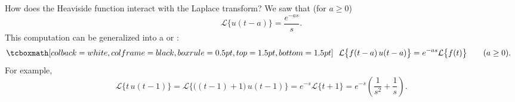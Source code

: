 How does the Heaviside function interact with the Laplace
transform?  We saw that (for $a \geq 0$)
\begin{equation*}
\mathcal{L} \bigl\{ u(t-a) \bigr\} = \frac{e^{-as}}{s} .
\end{equation*}
This computation can be generalized into a \emph{}
or \emph{}:
\begin{equation} \label{ltd:sseq}
\mybxbg{~~
\mathcal{L} \bigl\{ f(t-a) \, u(t-a) \bigr\}
= e^{-as} \mathcal{L} \bigl\{ f(t) \bigr\}
\qquad (a \geq 0).
~~}
\end{equation}
For example,
\begin{equation*}
\mathcal{L} \bigl\{ t \, u(t-1) \bigr\}
=
\mathcal{L} \bigl\{ \bigl( (t-1) + 1\bigr) \, u(t-1) \bigr\}
= e^{-s} \mathcal{L} \bigl\{ t+1 \bigr\}
= e^{-s} \left(\frac{1}{s^2} + \frac{1}{s} \right)
.
\end{equation*}

